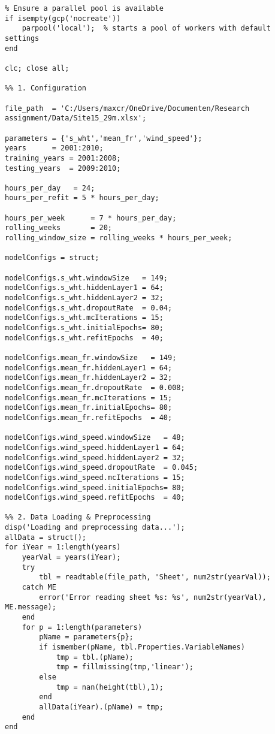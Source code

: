 \label{append:BNN_MCD_script}
\begin{verbatim}
% Ensure a parallel pool is available
if isempty(gcp('nocreate'))
    parpool('local');  % starts a pool of workers with default settings
end

clc; close all;

%% 1. Configuration

file_path  = 'C:/Users/maxcr/OneDrive/Documenten/Research assignment/Data/Site15_29m.xlsx';

parameters = {'s_wht','mean_fr','wind_speed'};
years      = 2001:2010;
training_years = 2001:2008;
testing_years  = 2009:2010;

hours_per_day   = 24;
hours_per_refit = 5 * hours_per_day;  

hours_per_week      = 7 * hours_per_day;
rolling_weeks       = 20;
rolling_window_size = rolling_weeks * hours_per_week;

modelConfigs = struct;

modelConfigs.s_wht.windowSize   = 149;
modelConfigs.s_wht.hiddenLayer1 = 64;
modelConfigs.s_wht.hiddenLayer2 = 32;
modelConfigs.s_wht.dropoutRate  = 0.04;
modelConfigs.s_wht.mcIterations = 15;
modelConfigs.s_wht.initialEpochs= 80;
modelConfigs.s_wht.refitEpochs  = 40;

modelConfigs.mean_fr.windowSize   = 149;
modelConfigs.mean_fr.hiddenLayer1 = 64;
modelConfigs.mean_fr.hiddenLayer2 = 32;
modelConfigs.mean_fr.dropoutRate  = 0.008;
modelConfigs.mean_fr.mcIterations = 15;
modelConfigs.mean_fr.initialEpochs= 80;
modelConfigs.mean_fr.refitEpochs  = 40;

modelConfigs.wind_speed.windowSize   = 48;
modelConfigs.wind_speed.hiddenLayer1 = 64;
modelConfigs.wind_speed.hiddenLayer2 = 32;
modelConfigs.wind_speed.dropoutRate  = 0.045;
modelConfigs.wind_speed.mcIterations = 15;
modelConfigs.wind_speed.initialEpochs= 80;
modelConfigs.wind_speed.refitEpochs  = 40;

%% 2. Data Loading & Preprocessing
disp('Loading and preprocessing data...');
allData = struct();
for iYear = 1:length(years)
    yearVal = years(iYear);
    try
        tbl = readtable(file_path, 'Sheet', num2str(yearVal));
    catch ME
        error('Error reading sheet %s: %s', num2str(yearVal), ME.message);
    end
    for p = 1:length(parameters)
        pName = parameters{p};
        if ismember(pName, tbl.Properties.VariableNames)
            tmp = tbl.(pName);
            tmp = fillmissing(tmp,'linear');
        else
            tmp = nan(height(tbl),1);
        end
        allData(iYear).(pName) = tmp;
    end
end


\end{verbatim}
